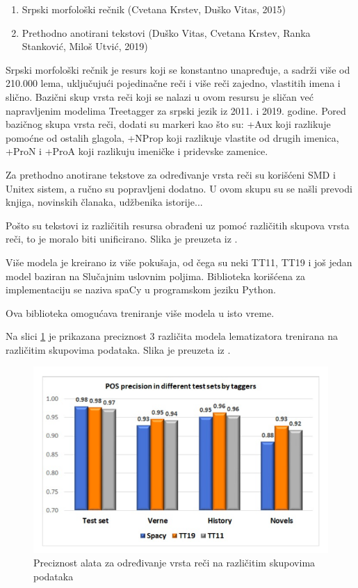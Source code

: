 \documentclass[12pt,oneside]{memoir}
\begin{document}
\begin{enumerate}
\item Srpski morfološki rečnik (Cvetana Krstev, Duško Vitas, 2015)
\item Prethodno anotirani tekstovi (Duško Vitas, Cvetana Krstev, Ranka Stanković, Miloš Utvić, 2019)
\end{enumerate}

Srpski morfološki rečnik je resurs koji se konstantno unapređuje, a sadrži više od 210.000 lema, uključujući pojedinačne reči i više reči zajedno, vlastitih imena i slično. Bazični skup vrsta reči koji se nalazi u ovom resursu je sličan već napravljenim modelima Treetagger za srpski jezik iz 2011. i 2019. godine.  Pored bazičnog skupa vrsta reči, dodati su markeri kao što su: +Aux koji razlikuje pomoćne od ostalih glagola, +NProp koji razlikuje vlastite od drugih imenica, +ProN i +ProA koji razlikuju imeničke i pridevske zamenice.

Za prethodno anotirane tekstove za određivanje vrsta reči su korišćeni SMD i Unitex sistem, a ručno su popravljeni dodatno. U ovom skupu su se našli prevodi knjiga, novinskih članaka, udžbenika istorije...

Pošto su tekstovi iz različitih resursa obrađeni uz pomoć različitih skupova vrsta reči, to je moralo biti unificirano. Slika je preuzeta iz \cite{tagger}.

Više modela je kreirano iz više pokušaja, od čega su neki TT11, TT19 i još jedan model baziran na Slučajnim uslovnim poljima. Biblioteka korišćena za implementaciju se naziva spaCy u programskom jeziku Python. 

Ova biblioteka omogućava treniranje više modela u isto vreme. 

Na slici \ref{img:pos_tagger} je prikazana preciznost 3 različita modela lematizatora trenirana na različitim skupovima podataka. Slika je preuzeta iz \cite{tagger}.

\begin{figure}[h!]
\centering
\includegraphics[width=.7\textwidth]{images/pos_tagger.png}
\caption{Preciznost alata za određivanje vrsta reči na različitim skupovima podataka}
\label{img:pos_tagger}
\end{figure}
\end{document}

